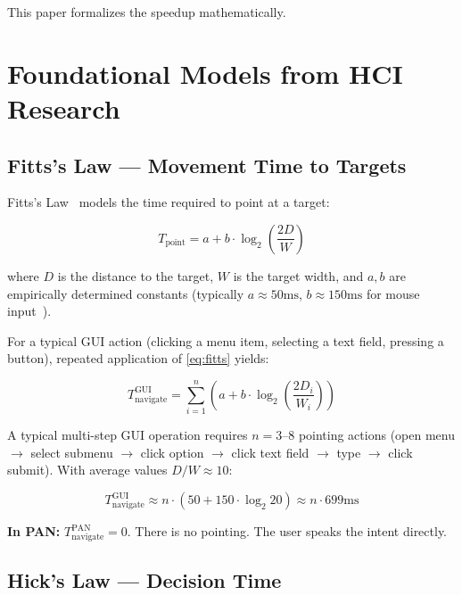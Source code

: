 \documentclass[11pt, a4paper]{article}
\begin{document}
This paper formalizes the speedup mathematically.

\section{Foundational Models from HCI Research}

\subsection{Fitts's Law --- Movement Time to Targets}

Fitts's Law~\cite{fitts1954} models the time required to point at a target:

\begin{equation}
  T_{\text{point}} = a + b \cdot \log_2\!\left(\frac{2D}{W}\right)
  \label{eq:fitts}
\end{equation}

where $D$ is the distance to the target, $W$ is the target width, and $a, b$
are empirically determined constants (typically $a \approx 50\text{ms}$,
$b \approx 150\text{ms}$ for mouse input~\cite{soukoreff2004}).

For a typical GUI action (clicking a menu item, selecting a text field, pressing
a button), repeated application of \eqref{eq:fitts} yields:

\begin{equation}
  T_{\text{navigate}}^{\text{GUI}} = \sum_{i=1}^{n} \left(a + b \cdot \log_2\!\left(\frac{2D_i}{W_i}\right)\right)
  \label{eq:fitts_sum}
\end{equation}

A typical multi-step GUI operation requires $n = 3\text{--}8$ pointing actions
(open menu $\to$ select submenu $\to$ click option $\to$ click text field $\to$
type $\to$ click submit). With average values $D/W \approx 10$:

\begin{equation}
  T_{\text{navigate}}^{\text{GUI}} \approx n \cdot (50 + 150 \cdot \log_2 20) \approx n \cdot 699\text{ms}
\end{equation}

\textbf{In PAN:} $T_{\text{navigate}}^{\text{PAN}} = 0$. There is no pointing.
The user speaks the intent directly.

\subsection{Hick's Law --- Decision Time}
\end{document}
